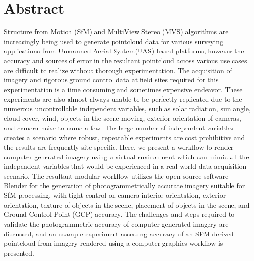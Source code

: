 \section*{Abstract}
Structure from Motion (SfM) and MultiView Stereo (MVS) algorithms are increasingly being used to generate pointcloud data for various surveying applications from Unmanned Aerial System(UAS) based platforms, however the accuracy and sources of error in the resultant pointcloud across various use cases are difficult to realize without thorough experimentation.  The acquisition of imagery and rigorous ground control data at field sites required for this experimentation is a time consuming and sometimes expensive endeavor.  These experiments are also almost always unable to be perfectly replicated due to the numerous uncontrollable independent variables, such as solar radiation, sun angle, cloud cover, wind, objects in the scene moving, exterior orientation of cameras, and camera noise to name a few.  The large number of independent variables creates a scenario where robust, repeatable experiments are cost prohibitive and the results are frequently site specific.  Here, we present a workflow to render computer generated imagery using a virtual environment which can mimic all the independent variables that would be experienced in a real-world data acquisition scenario.  The resultant modular workflow utilizes the open source software Blender for the generation of photogrammetrically accurate imagery suitable for SfM processing, with tight control on camera interior orientation, exterior orientation, texture of objects in the scene, placement of objects in the scene, and Ground Control Point (GCP) accuracy.  The challenges and steps required to validate the photogrammetric accuracy of computer generated imagery are discussed, and an example experiment assessing accuracy of an SFM derived pointcloud from imagery rendered using a computer graphics workflow is presented.